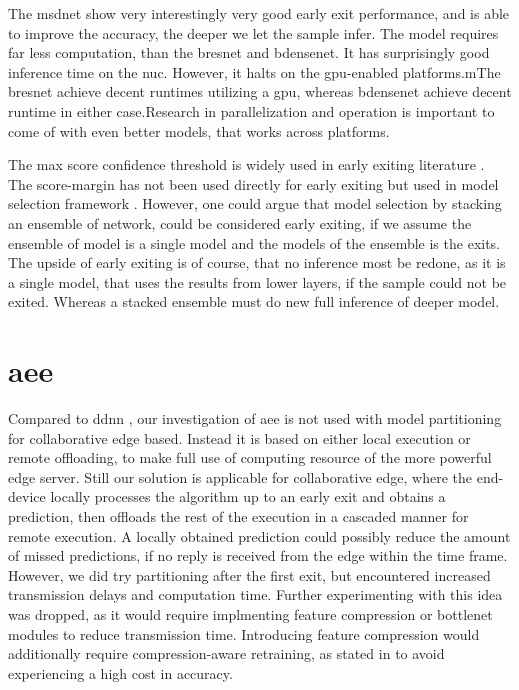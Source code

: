 The \gls{msdnet} \cite{huang_multi-scale_2017} show very interestingly very good early exit performance, and is able to improve the accuracy, the deeper we let the sample infer. The model requires far less computation, than the \gls{bresnet} and \gls{bdensenet}. It has surprisingly good inference time on the \gls{nuc}. However, it halts on the \gls{gpu}-enabled platforms.mThe \gls{bresnet} achieve decent runtimes utilizing a \gls{gpu}, whereas \gls{bdensenet} achieve decent runtime in either case.Research in parallelization and operation is important to come of with even better models, that works across platforms.
 
The max score confidence threshold is widely used in early exiting literature \cite{leroux_resource-constrained_2015, leroux_cascading_2017, kaya_shallow-deep_nodate, berestizshevsky_sacrificing_2019}. The score-margin has not been used directly for early exiting but used in model selection framework \cite{park_big/little_2015,tann_flexible_2018}. However, one could argue that model selection by stacking an ensemble of network, could be considered early exiting, if we assume the ensemble of model is a single model and the models of the ensemble is the exits. The upside of early exiting is of course, that no inference most be redone, as it is a single model, that uses the results from lower layers, if the sample could not be exited. Whereas a stacked ensemble must do new full inference of deeper model. 

\section*{\acrlong{aee}}

Compared to \gls{ddnn} \cite{teerapittayanon_distributed_2017}, our investigation of \gls{aee} is not used with model partitioning for collaborative edge based. Instead it is based on either local execution or remote offloading, to make full use of computing resource of the more powerful edge server. Still our solution is applicable for collaborative edge, where the end-device locally processes the algorithm up to an early exit and obtains a prediction, then offloads the rest of the execution in a cascaded manner for remote execution. A locally obtained prediction could possibly reduce the amount of missed predictions, if no reply is received from the edge within the time frame. However, we did try partitioning after the first exit, but encountered increased transmission delays and computation time. Further experimenting with this idea was dropped, as it would require implmenting feature compression or \gls{bottlenet} modules to reduce transmission time. Introducing feature compression would additionally require compression-aware retraining, as stated in \cite{choi_near-lossless_2018,choi_near-lossless_2018,eshratifar_bottlenet:_2019}  to avoid experiencing a high cost in accuracy.

